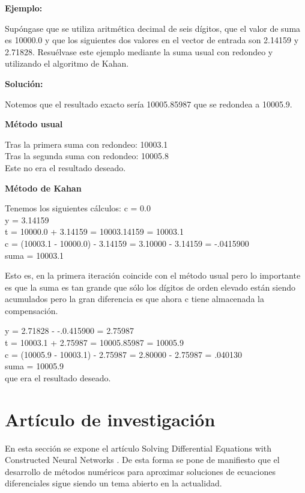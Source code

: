 \documentclass{article}
\theoremstyle{theorem-style}  %
\theoremstyle{definition-style}
\theoremstyle{example-style}
\begin{document}
\textbf{Ejemplo:}

Supóngase que se utiliza aritmética decimal de seis dígitos, que el valor de suma es 10000.0 y que los siguientes dos valores en el vector de entrada son 2.14159 y 2.71828. Resuélvase este ejemplo mediante la suma usual con redondeo y utilizando el algoritmo de Kahan.

\textbf{Solución:}

Notemos que el resultado exacto sería 10005.85987 que se redondea a 10005.9.

\textbf{Método usual}

Tras la primera suma con redondeo: 10003.1 \\
Tras la segunda suma con redondeo: 10005.8 \\
Este no era el resultado deseado.

\textbf{Método de Kahan}

Tenemos los siguientes cálculos:
c = 0.0 \\
y = 3.14159  \\
t = 10000.0 + 3.14159 = 10003.14159 = 10003.1 \\
c = (10003.1 - 10000.0) - 3.14159 = 3.10000 - 3.14159 = -.0415900 \\
suma = 10003.1

Esto es, en la primera iteración coincide con el método usual pero lo importante es que la suma es tan grande que sólo los dígitos de orden elevado están siendo acumulados pero la gran diferencia es que ahora c tiene almacenada la compensación.

y = 2.71828 - -.0.415900 = 2.75987 \\
t = 10003.1 + 2.75987 = 10005.85987 = 10005.9 \\
c = (10005.9 - 10003.1) - 2.75987 = 2.80000 - 2.75987 = .040130 \\
suma = 10005.9 \\

que era el resultado deseado.

\section{Artículo de investigación} \label{sec:paper}

	En esta sección se expone el artículo Solving Differential Equations with Constructed Neural Networks \cite{nn-de}. De esta forma se pone de manifiesto que el desarrollo de métodos numéricos para aproximar soluciones de ecuaciones diferenciales sigue siendo un tema abierto en la actualidad.
	
\end{document}
